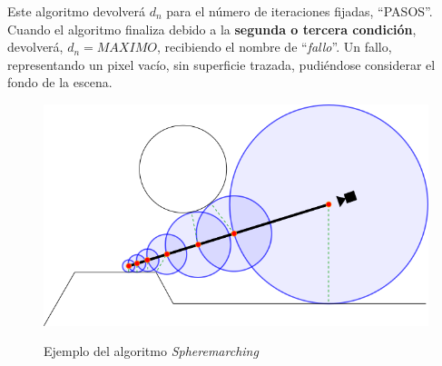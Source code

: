 Este algoritmo devolverá \(d_n\) para el número de iteraciones fijadas, \enquote{PASOS}. Cuando el algoritmo finaliza debido a la \textbf{segunda o tercera condición}, devolverá, \(d_n=MAXIMO\), recibiendo el nombre de \enquote{\textit{fallo}}. Un fallo, representando un pixel vacío, sin superficie trazada, pudiéndose considerar el fondo de la escena.
 \begin{figure}[H]
  \centering
  \captionsetup{justification=centering}%
  \includegraphics[width=1.0\textwidth]{secciones/imagenes/starting/raymarching.png}\label{fig:spheremarcher}
  \caption{Ejemplo del algoritmo \textit{Spheremarching}}
\end{figure}

